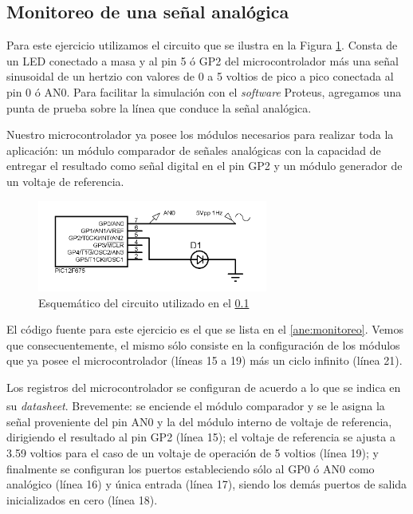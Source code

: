 \documentclass[a4paper]{article}
\let\originalcite\cite
\renewcommand{\cite}[2][]{\textsuperscript{\originalcite{#2}}}
\newenvironment{ejercicios}
    {\setcounter{secnumdepth}{3}
    \renewcommand\thesubsection{Ejercicio \arabic{subsection}}}
    {\setcounter{secnumdepth}{0}}
\begin{document}
\begin{ejercicios}

    \subsection{Monitoreo de una señal analógica}\label{ej:monitoreo}

    Para este ejercicio utilizamos el circuito que se ilustra en la
    Figura \ref{fig:esquematico1}. Consta de un LED conectado a masa 
    y al pin 5 ó GP2 del microcontrolador más una señal sinusoidal de
    un hertzio con valores de 0 a 5 voltios de pico a pico 
    conectada al pin 0 ó AN0. Para facilitar la simulación con el 
    \textit{software} Proteus, agregamos una punta de prueba sobre la 
    línea que conduce la señal analógica.
    
    Nuestro microcontrolador ya posee los módulos necesarios para 
    realizar toda la aplicación: un módulo comparador de señales 
    analógicas con la capacidad de entregar el resultado como señal 
    digital en el pin GP2 y un módulo generador de un voltaje de 
    referencia.

    \begin{figure}[h]\centering
        \includegraphics[height=3cm]{esquematico1.png}
        \caption{Esquemático del circuito utilizado en el  
        \ref{ej:monitoreo}}\label{fig:esquematico1}
    \end{figure}

    El código fuente para este ejercicio es el que se lista en el 
    \ref{ane:monitoreo}. Vemos que consecuentemente, el mismo sólo
    consiste en la configuración de los módulos que ya posee el 
    microcontrolador (líneas 15 a 19) más un ciclo infinito (línea 21).

    Los registros del microcontrolador se configuran de acuerdo a lo 
    que se indica en su \textit{datasheet}\cite{bid:datasheet}. 
    Brevemente: se enciende el módulo comparador y se le asigna la
    señal proveniente del pin AN0 y la del módulo interno de voltaje 
    de referencia, dirigiendo el resultado al pin GP2 (línea 15); el 
    voltaje de referencia se ajusta a 3.59 voltios para el caso de un
    voltaje de operación de 5 voltios (línea 19); y finalmente se 
    configuran los puertos estableciendo sólo al GP0 ó AN0 como 
    analógico (línea 16) y única entrada (línea 17), siendo los demás
    puertos de salida inicializados en cero (línea 18).


\end{ejercicios}
\end{document}
